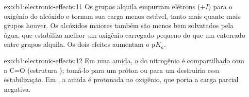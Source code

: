 \begin{solution}{exo:b1:electronic-effects:11}
Os grupos alquila empurram elétrons ($+I$) para o oxigênio do alcóxido e
tornam sua carga menos estável, tanto mais quanto mais grupos houver. Os
alcóxidos maiores também são menos bem solvatados pela água, que
estabiliza melhor um oxigênio carregado pequeno do que um enterrado
entre grupos alquila. Os dois efeitos aumentam o
$\mathrm{p}K_a$.
\end{solution}

\begin{solution}{exo:b1:electronic-effects:12}
Em uma amida, o  do nitrogênio é compartilhado com a C=O
(estrutura ); tomá-lo para um próton ou para um 
destruiria essa estabilização. Em , a amida é protonada no
oxigênio, que porta a carga parcial negativa.
\end{solution}

